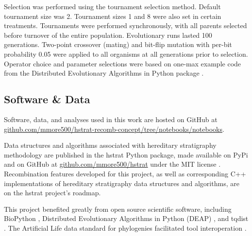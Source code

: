 Selection was performed using the tournament selection method.
Default tournament size was 2.
Tournament sizes 1 and 8 were also set in certain treatments.
Tournaments were performed synchronously, with all parents selected before turnover of the entire population.
Evolutionary runs lasted 100 generations.
Two-point crossover (mating) and bit-flip mutation with per-bit probability 0.05 were applied to all organisms at all generations prior to selection.
Operator choice and parameter selections were based on one-max example code from the Distributed Evolutionary Algorithms in Python package \citep{fortin2012deap}.







\subsection{Software \& Data}
\label{sec:software-data}

Software, data, and analyses used in this work are hosted on GitHub at \url{github.com/mmore500/hstrat-recomb-concept/tree/notebooks/notebooks}.

Data structures and algorithms associated with hereditary stratigraphy methodology are published in the hstrat Python package, made available on PyPi and on GitHub at \url{github.com/mmore500/hstrat} under the MIT license \citep{moreno2022hstrat}.
Recombination features developed for this project, as well as corresponding C++ implementations of hereditary stratigraphy data structures and algorithms, are on the hstrat project's roadmap.

This project benefited greatly from open source scientific software, including BioPython \citep{cock2009biopython}, Distributed Evolutionary Algorithms in Python (DEAP) \citep{fortin2012deap}, and tqdist \citep{sand2014tqdist}.
The Artificial Life data standard for phylogenies facilitated tool interoperation \citep{lalejini2019data}.

